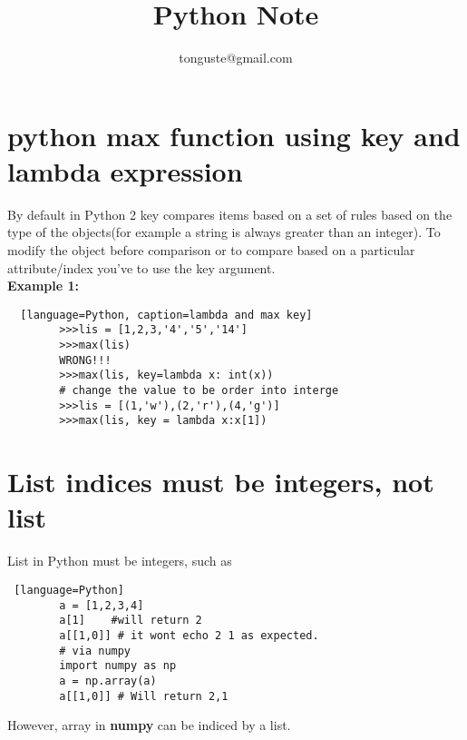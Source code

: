 \documentclass[a4paper, 12pt]{article}
\title{Python Note}
\author{tonguste@gmail.com}
\begin{document}
    \maketitle
	\tableofcontents
    \section{python max function using key and lambda expression}
	By default in Python 2 key compares items based on a set of rules based on the type of the objects(for example a string is always greater than an integer).
	To modify the object before comparison or to compare based on a particular attribute/index you've to use the key argument.\\
	\textbf{Example 1:}
	
	\begin{lstlisting}	[language=Python, caption=lambda and max key]
		>>>lis = [1,2,3,'4','5','14']
		>>>max(lis)
		WRONG!!!
		>>>max(lis, key=lambda x: int(x))
		# change the value to be order into interge
		>>>lis = [(1,'w'),(2,'r'),(4,'g')]
		>>>max(lis, key = lambda x:x[1])

	\end{lstlisting}

    \section{List indices must be integers, not list}
    List in Python must be integers, such as 
    \begin{lstlisting} [language=Python]
        a = [1,2,3,4]
        a[1]    #will return 2
        a[[1,0]] # it wont echo 2 1 as expected.
        # via numpy
        import numpy as np
        a = np.array(a)
        a[[1,0]] # Will return 2,1
    \end{lstlisting}
    However, array in \textbf{numpy} can be indiced by a list.
\end{document}
